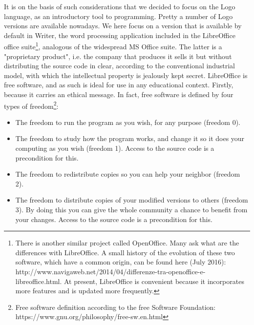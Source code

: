 It is on the basis of such considerations that we decided to focus on the Logo language, as an introductory tool to programming. Pretty a number of Logo versions are available nowadays. We here focus on a version that is available by default in Writer, the word processing application included in the LibreOffice office suite\footnote{There is another similar project called OpenOffice. Many ask what are the differences with LibreOffice. A small history of the evolution of these two software, which have a common origin, can be found here (July 2016): http://www.navigaweb.net/2014/04/differenze-tra-openoffice-e-libreoffice.html. At present, LibreOffice is convenient because it incorporates more features and is updated more frequently.}, analogous of the widespread MS Office suite. The latter is a "proprietary product", i.e. the company that produces it sells it but without distributing the source code in clear, according to the conventional industrial model, with which the intellectual property is jealously kept secret. LibreOffice is free software, and as such is ideal for use in any educational context. Firstly, because it carries an ethical message. In fact, free software is defined by four types of freedom\footnote{Free software definition according to the free Software Foundation: https://www.gnu.org/philosophy/free-sw.en.html}:

\begin{itemize}
\item The freedom to run the program as you wish, for any purpose (freedom 0).
\item The freedom to study how the program works, and change it so it does your computing as you wish (freedom 1). Access to the source code is a precondition for this.
\item The freedom to redistribute copies so you can help your neighbor (freedom 2).
\item The freedom to distribute copies of your modified versions to others (freedom 3). By doing this you can give the whole community a chance to benefit from your changes. Access to the source code is a precondition for this.
\end{itemize}

